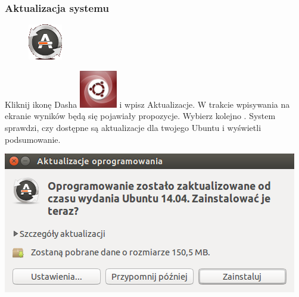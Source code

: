 \subsubsection{Aktualizacja systemu}
\label{rzeczy_do_zrobienia_po_instalacji}
\begin{figure}
	\vspace{-10pt}
	\includegraphics[width=\linewidth]{images/pierwsze_uruchomienie_aktualizacja1.png}
\end{figure}

Kliknij ikonę Dasha \includegraphics[scale=0.35]{images/ikony_dash.png} i wpisz \textcolor{ubuntu_orange}{Aktualizacje}. W trakcie wpisywania na ekranie wyników będą się pojawiały propozycje. Wybierz kolejno .
System sprawdzi, czy dostępne są aktualizacje dla twojego Ubuntu i wyświetli podsumowanie.
\begin{center}
	\vspace{-10pt}
	\includegraphics{images/pierwsze_uruchomienie_aktualizacja2.png}
\end{center}

